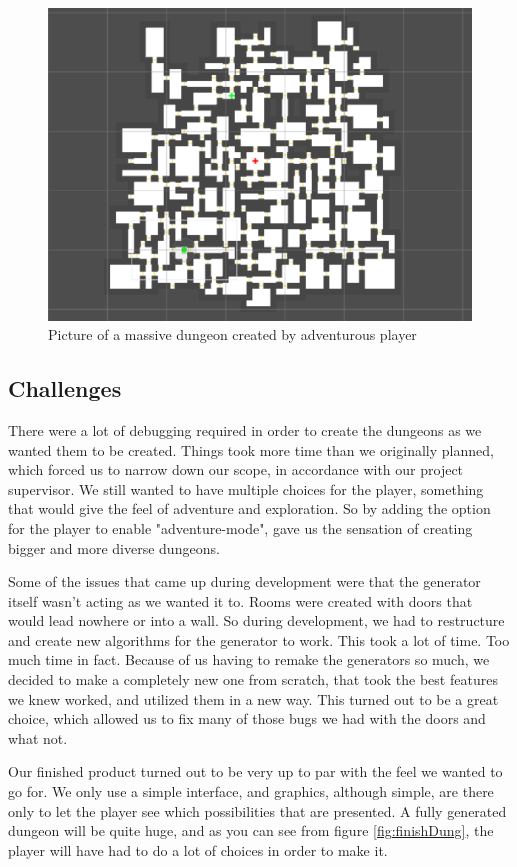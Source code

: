 \documentclass[conference,compsoc]{IEEEtran}
\begin{document}
\begin{figure}[h]
	\graphicspath{{figures/}}
	\includegraphics[width = \columnwidth ]{BigDungeon.png}
	\caption{Picture of a massive dungeon created by adventurous player}
	\label{fig:bigdung}
\end{figure}
\subsection{Challenges}
There were a lot of debugging required in order to create the dungeons as we wanted them to be created. Things took more time than we originally planned, which forced us to narrow down our scope, in accordance with our project supervisor. We still wanted to have multiple choices for the player, something that would give the feel of adventure and exploration. So by adding the option for the player to enable "adventure-mode", gave us the sensation of creating bigger and more diverse dungeons.

Some of the issues that came up during development were that the generator itself wasn't acting as we wanted it to. Rooms were created with doors that would lead nowhere or into a wall. So during development, we had to restructure and create new algorithms for the generator to work. This took a lot of time. Too much time in fact. Because of us having to remake the generators so much, we decided to make a completely new one from scratch, that took the best features we knew worked, and utilized them in a new way. This turned out to be a great choice, which allowed us to fix many of those bugs we had with the doors and what not.

Our finished product turned out to be very up to par with the feel we wanted to go for. We only use a simple interface, and graphics, although simple, are there only to let the player see which possibilities that are presented. 
A fully generated dungeon will be quite huge, and as you can see from figure \ref{fig:finishDung}, the player will have had to do a lot of choices in order to make it. 
\end{document}

